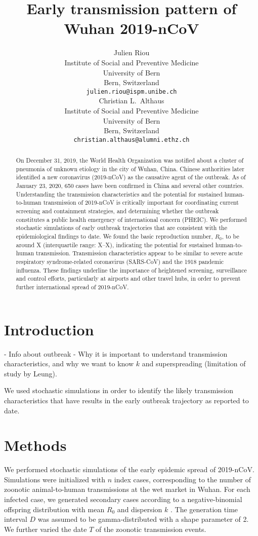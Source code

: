 \documentclass{article}
\title{Early transmission pattern of Wuhan 2019-nCoV}
\author{
   Julien Riou \\
  Institute of Social and Preventive Medicine\\
  University of Bern\\
  Bern, Switzerland \\
  \texttt{julien.riou@ispm.unibe.ch} \\
  \And
Christian L.~Althaus \\
Institute of Social and Preventive Medicine\\
University of Bern\\
Bern, Switzerland \\
\texttt{christian.althaus@alumni.ethz.ch}
}
\begin{document}
\maketitle

\begin{abstract}
On December 31, 2019, the World Health Organization was notified about a cluster of pneumonia of unknown etiology in the city of Wuhan, China. Chinese authorities later identified a new coronavirus (2019-nCoV) as the causative agent of the outbreak. As of January 23, 2020, 650 cases have been confirmed in China and several other countries. Understanding the transmission characteristics and the potential for sustained human-to-human transmission of 2019-nCoV is critically important for coordinating current screening and containment strategies, and determining whether the outbreak constitutes a public health emergency of international concern (PHEIC). We performed stochastic simulations of early outbreak trajectories that are consistent with the epidemiological findings to date. We found the basic reproduction number, $R_0$, to be around X (interquartile range: X--X), indicating the potential for sustained human-to-human transmission. Transmission characteristics appear to be similar to severe acute respiratory syndrome-related coronavirus (SARS-CoV) and the 1918 pandemic influenza. These findings underline the importance of heightened screening, surveillance and control efforts, particularly at airports and other travel hubs, in order to prevent further international spread of 2019-nCoV.
\end{abstract}

\section{Introduction}

\citet{Shi:2020}

- Info about outbreak
- Why it is important to understand transmission characteristics, and why we want to know $k$ and superspreading (limitation of study by Leung).

We used stochastic simulations in order to identify the likely transmission characteristics that have results in the early outbreak trajectory as reported to date.

\section{Methods}
We performed stochastic simulations of the early epidemic spread of 2019-nCoV. Simulations were initialized with $n$ index cases, corresponding to the number of zoonotic animal-to-human transmissions at the wet market in Wuhan. For each infected case, we generated secondary cases according to a negative-binomial offspring distribution with mean $R_0$ and dispersion $k$ \citep{Althaus:2015b}. The generation time interval $D$ was assumed to be gamma-distributed with a shape parameter of 2. We further varied the date $T$ of the zoonotic transmission events.
\end{document}
